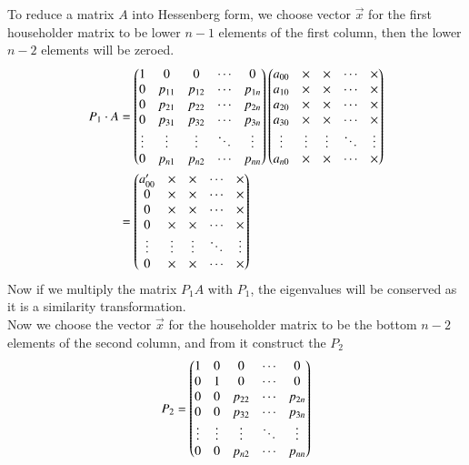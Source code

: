 \documentclass[journal]{IEEEtran}
\begin{document}
To reduce a matrix $A$ into Hessenberg form, we choose vector $\vec{x}$ for the first householder matrix to be lower $n-1$ elements of the first column, then the lower $n-2$ elements will be zeroed.
\begin{align}
P_1\cdot A &= \begin{pmatrix}
1 & 0 & 0 & \cdots & 0 \\
0 & p_{11} & p_{12} & \cdots & p_{1n} \\
0      & p_{21} & p_{22} & \cdots & p_{2n} \\
0      & p_{31} & p_{32} & \cdots & p_{3n} \\
\vdots & \vdots & \vdots & \ddots & \vdots \\
0      & p_{n1} & p_{n2} & \cdots & p_{nn}
\end{pmatrix}\begin{pmatrix}
a_{00} & \times & \times & \cdots & \times \\
a_{10} & \times & \times & \cdots & \times \\
a_{20} & \times & \times & \cdots & \times \\
a_{30} & \times & \times & \cdots & \times \\
\vdots & \vdots & \vdots & \ddots & \vdots \\
a_{n0} & \times & \times & \cdots & \times
\end{pmatrix}\\
&=\begin{pmatrix}
a_{00}^\prime & \times & \times & \cdots & \times \\
0 & \times & \times & \cdots & \times \\
0      & \times & \times & \cdots & \times \\
0      & \times   & \times & \cdots & \times \\
\vdots & \vdots & \vdots & \ddots & \vdots \\
0      & \times      & \times      & \cdots & \times
\end{pmatrix}
\end{align}
Now if we multiply the matrix $P_1A$ with $P_1$, the eigenvalues will be conserved as it is a similarity transformation.\\
Now we choose the vector $\vec{x}$ for the householder matrix to be the bottom $n-2$ elements of the second column, and from it construct the $P_2$
\begin{align}
P_2 = \begin{pmatrix}
1 & 0 & 0 & \cdots & 0 \\
0 & 1 & 0 & \cdots & 0 \\
0 & 0 & p_{22} & \cdots & p_{2n} \\
0 & 0 & p_{32} & \cdots & p_{3n} \\
\vdots & \vdots & \vdots & \ddots & \vdots \\
0 & 0 & p_{n2} & \cdots & p_{nn}
\end{pmatrix}
\end{align}
\end{document}

